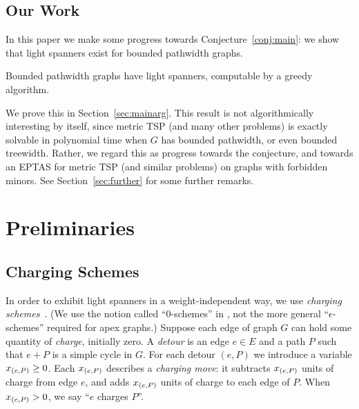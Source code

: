 \documentclass{llncs}
\begin{document}
\subsection{Our Work}

In this paper we make some progress towards
Conjecture~\ref{conj:main}: we show that light spanners exist for
bounded pathwidth graphs.
\begin{theorem}\label{thm:main}
Bounded pathwidth graphs have light spanners, computable by a greedy
algorithm.
\end{theorem}
We prove this in Section~\ref{sec:mainarg}.
This result is not algorithmically interesting by itself, since metric
TSP (and many other problems) is exactly solvable in polynomial time
when $G$ has bounded pathwidth, or even bounded treewidth.  Rather, we
regard this as progress towards the conjecture, and towards an EPTAS
for metric TSP (and similar problems) on graphs with forbidden minors.
See Section~\ref{sec:further} for some further remarks.

\section{Preliminaries}

\subsection{Charging Schemes}

In order to exhibit light spanners in a weight-independent way, we use
\emph{charging schemes}~\cite{Grigni:2002:LSA:545381.545492}.  (We use
the notion called ``0-schemes'' in
\cite{Grigni:2002:LSA:545381.545492}, not the more general
``$\epsilon$-schemes'' required for apex graphs.)  Suppose each edge
of graph $G$ can hold some quantity of \emph{charge}, initially zero.
A \emph{detour} is an edge $e\in E$ and a path $P$ such that $e+P$ is
a simple cycle in $G$.  For each detour $(e,P)$ we introduce a
variable $x_{(e,P)}\geq0$.  Each $x_{(e,P)}$ describes a
\emph{charging move}: it subtracts $x_{(e,P)}$ units of charge from
edge $e$, and adds $x_{(e,P)}$ units of charge to each edge of $P$.
When $x_{(e,P)}>0$, we say ``$e$ charges $P$''.
\end{document}
